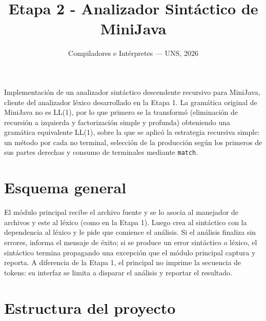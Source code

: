 \documentclass[11pt,a4paper]{article}
\title{Etapa 2 - Analizador Sintáctico de MiniJava}
\author{Compiladores e Intérpretes --- UNS, 2026}
\date{}
\begin{document}
\sloppy

\maketitle

\noindent
Implementación de un analizador sintáctico descendente recursivo para MiniJava, cliente del
analizador léxico desarrollado en la Etapa 1. La gramática original de MiniJava no es LL(1),
por lo que primero se la transformó (eliminación de recursión a izquierda y factorización
simple y profunda) obteniendo una gramática equivalente LL(1), sobre la que se aplicó la
estrategia recursiva simple: un método por cada no terminal, selección de la producción
según los primeros de sus partes derechas y consumo de terminales mediante \texttt{match}.

\section{Esquema general}

El módulo principal recibe el archivo fuente y se lo asocia al manejador de archivos y este
al léxico (como en la Etapa 1). Luego crea al sintáctico con la dependencia al léxico y le
pide que comience el análisis. Si el análisis finaliza sin errores, informa el mensaje de
éxito; si se produce un error sintáctico o léxico, el sintáctico termina propagando una
excepción que el módulo principal captura y reporta. A diferencia de la Etapa 1, el
principal no imprime la secuencia de tokens: su interfaz se limita a disparar el análisis y
reportar el resultado.

\section{Estructura del proyecto}
\end{document}
